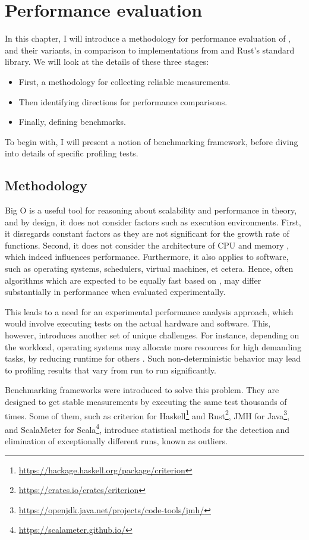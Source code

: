 \chapter{Performance evaluation}
In this chapter, I will introduce a methodology for performance evaluation of \rrbvec{}, \pvec{} and their variants, in comparison to implementations from \imrsvec{} and Rust's standard library. We will look at the details of these three stages:

\begin{itemize}
    \item First, a methodology for collecting reliable measurements.
    \item Then identifying directions for performance comparisons.
    \item Finally, defining benchmarks.
\end{itemize}

To begin with, I will present a notion of benchmarking framework, before diving into details of specific profiling tests.

\section{Methodology}
Big O is a useful tool for reasoning about scalability and performance in theory, and by design, it does not consider factors such as execution environments. First, it disregards constant factors as they are not significant for the growth rate of functions. Second, it does not consider the architecture of CPU and memory \cite{what-programmer-should-know-about-memory}, which indeed influences performance. Furthermore, it also applies to software, such as operating systems, schedulers, virtual machines, et cetera. Hence, often algorithms which are expected to be equally fast based on \bigochar{}, may differ substantially in performance when evaluated experimentally.

This leads to a need for an experimental performance analysis approach, which would involve executing tests on the actual hardware and software. This, however, introduces another set of unique challenges. For instance, depending on the workload, operating systems may allocate more resources for high demanding tasks, by reducing runtime for others \cite{statistically-rigorous-java-performance-evaluation}. Such non-deterministic behavior may lead to profiling results that vary from run to run significantly.

Benchmarking frameworks were introduced to solve this problem. They are designed to get stable measurements by executing the same test thousands of times. Some of them, such as criterion for Haskell\footnote{\url{https://hackage.haskell.org/package/criterion}} and Rust\footnote{\url{https://crates.io/crates/criterion}}, JMH for Java\footnote{\url{https://openjdk.java.net/projects/code-tools/jmh/}}, and ScalaMeter for Scala\footnote{\url{https://scalameter.github.io/}}, introduce statistical methods for the detection and elimination of exceptionally different runs, known as outliers.

